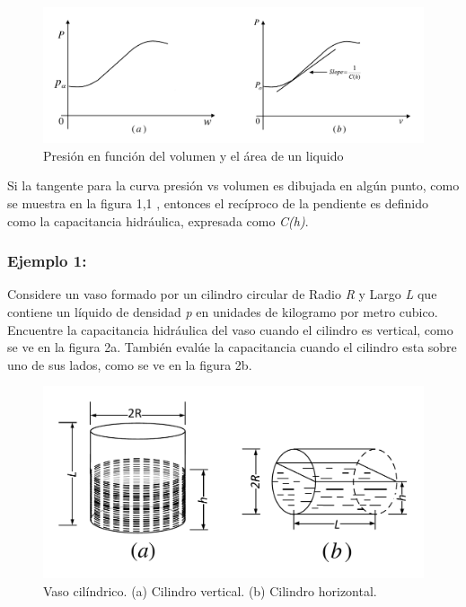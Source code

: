 \documentclass[a4paper,12pt,twoside]{proyectotanquesecci}
\begin{document}
\begin{figure}[h]
\centering
\includegraphics[scale=0.4]{Figura1}
\renewcommand{\figurename}{Fig.}
\caption{Presión en función del volumen y el área de un liquido}
\label{Presión en función del volumen y el área de un liquido}
\end{figure}

Si la tangente para la curva  presión vs volumen es dibujada en algún punto, como se muestra en la figura 1,1 , entonces el recíproco de la pendiente es definido como la capacitancia hidráulica, expresada como \textit{C(h)}.

\subsubsection{Ejemplo 1:}

Considere un vaso formado por un cilindro circular de Radio \textit{R} y Largo \textit{L} que contiene un líquido de densidad \textit{p} en unidades de kilogramo por metro cubico.
Encuentre la capacitancia hidráulica del vaso cuando el cilindro es vertical, como se ve en la figura 2a. También evalúe la capacitancia cuando el cilindro esta sobre uno de sus lados, como se ve en la figura 2b.

\begin{figure}[h]
\centering
\includegraphics[scale=0.4]{Figura2}
\renewcommand{\figurename}{Fig.}
\caption{Vaso cilíndrico. (a) Cilindro vertical. (b) Cilindro horizontal.}
\label{Vaso cilíndrico. (a) Cilindro vertical. (b) Cilindro horizontal.}
\end{figure}
\end{document}
